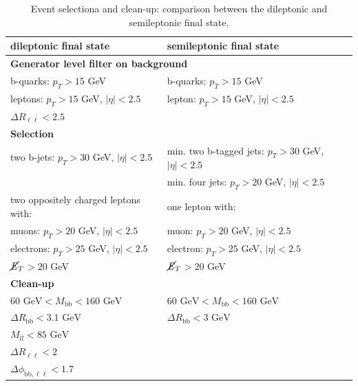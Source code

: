 \documentclass[10pt,a4paper]{article}
\newcommand{\levels}[1]{ \multicolumn{2}{l}{\hspace{-1em}\textbf{#1}}}
\newcommand{\T}{\rule{0pt}{2.9ex}}       %
\newcommand{\lnu}{$\ell\nu$}
\renewcommand{\ll}{\ell\ell}
\newcommand{\bb}{\text{bb}}
\newcommand{\MET}{$\cancel{\it{E}}_{T}$}
\begin{document}
\begin{table}[p]
	\centering
	\caption{Event selectiona and clean-up: comparison between the dileptonic and semileptonic final state.} \vspace{5pt}
	\label{cuts}
	\begin{tabular}{@{\quad}ll@{}}
	\toprule
	dileptonic final state                     &   semileptonic final state   \\
	\midrule
	\levels{Generator level filter on background} \T\\
	b-quarks: $p_T > 15$ GeV                      & b-quarks: $p_T > 15$ GeV    \\
	leptons: $p_T > 15$ GeV, $|\eta| < 2.5$       & lepton: $p_T > 15$ GeV, $|\eta| < 2.5$    \\
	$\Delta R_{\ll} < 2.5$                        & \\%
	\levels{Selection} \T\\
	two b-jets: $p_T > 30$ GeV, $|\eta|<2.5$      & min. two b-tagged jets: $p_T > 30$ GeV, $|\eta|<2.5$ \\
	                                              & min. four jets: $p_T > 20$ GeV, $|\eta|<2.5$ \\
	two oppositely charged leptons with:          & one lepton with: \\
	\quad muons: $p_T > 20$ GeV, $|\eta|<2.5$     & \quad muon: $p_T > 20$ GeV, $|\eta|<2.5$ \\
	\quad electrons: $p_T > 25$ GeV, $|\eta|<2.5$ & \quad electron: $p_T > 25$ GeV, $|\eta|<2.5$ \\
	\MET $> 20$ GeV                                & \MET $> 20$ GeV \\
	\levels{Clean-up} \T\\
	$60 \text{ GeV} < M_{\bb} < 160 \text{ GeV}$  & $60 \text{ GeV} < M_{\bb} < 160 \text{ GeV}$ \\
	$\Delta R_{\bb} < 3.1 \text{ GeV}$            & $\Delta R_{\bb} < 3 \text{ GeV}$ \\
	$M_{ll} < 85 \text{ GeV}$                     & \\
	$\Delta R_{\ll} < 2$                          & \\
	$\Delta \phi_{\text{bb},\ll} < 1.7$           & \\
	
	\end{tabular}
\end{table}
\end{document}
